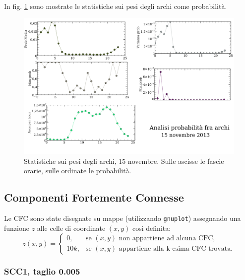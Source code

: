 \documentclass[10pt,a4paper]{article}
\begin{document}
In fig. \ref{img:probs} sono mostrate le statistiche sui pesi degli archi come probabilità.
\begin{figure}
 \includegraphics[scale=.6]{img/probs15nov.png}
 \caption{Statistiche sui pesi degli archi, 15 novembre. Sulle ascisse le fascie orarie, sulle ordinate le probabilità.}
 \label{img:probs}
\end{figure}

\subsection{Componenti Fortemente Connesse}

Le CFC sono state disegnate su mappe (utilizzando \verb!gnuplot!) assegnando una funzione $z$ alle celle di
coordinate $(x,y)$ così definita:
$$
z(x,y) =
\begin{cases}
0, & \text{se $(x,y)$ non appartiene ad alcuna CFC,} \\
10k, & \text{se $(x,y)$ appartiene alla k-esima CFC trovata.}
\end{cases}
$$

\subsubsection{SCC1, taglio 0.005}
\end{document}
